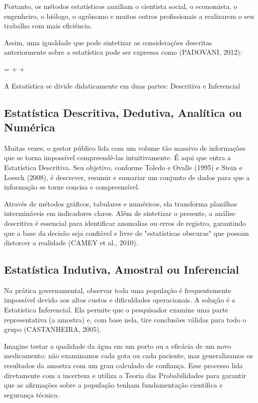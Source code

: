 Portanto, os métodos estatísticos auxiliam o cientista social, o economista, o engenheiro, o biólogo, o agrônomo e muitos outros profissionais a realizarem o seu trabalho com mais eficiência.\vskip0.3cm

Assim, uma igualdade que pode sintetizar as considerações descritas anteriormente sobre a estatística pode ser expressa como (PADOVANI, 2012):

\begin{center}
 =  +  + 
\end{center}

A Estatística se divide didaticamente em duas partes: Descritiva e Inferencial


\subsection{Estatística Descritiva, Dedutiva, Analítica ou Numérica}

Muitas vezes, o gestor público lida com um volume tão massivo de informações que se torna impossível compreendê-las intuitivamente. É aqui que entra a Estatística Descritiva. Seu objetivo, conforme Toledo e Ovalle (1995) e Stein e Loesch (2008), é descrever, resumir e sumariar um conjunto de dados para que a informação se torne concisa e compreensível. \vskip0.3cm

Através de métodos gráficos, tabulares e numéricos, ela transforma planilhas intermináveis em indicadores claros. Além de sintetizar o presente, a análise descritiva é essencial para identificar anomalias ou erros de registro, garantindo que a base da decisão seja confiável e livre de "estatísticas obscuras" que possam distorcer a realidade (CAMEY et al., 2010).

\subsection{Estatística Indutiva, Amostral ou Inferencial}

Na prática governamental, observar toda uma população é frequentemente impossível devido aos altos custos e dificuldades operacionais. A solução é a Estatística Inferencial. Ela permite que o pesquisador examine uma parte representativa (a amostra) e, com base nela, tire conclusões válidas para todo o grupo (CASTANHEIRA, 2005).  \vskip0.3cm

Imagine testar a qualidade da água em um porto ou a eficácia de um novo medicamento: não examinamos cada gota ou cada paciente, mas generalizamos os resultados da amostra com um grau calculado de confiança. Esse processo lida diretamente com a incerteza e utiliza a Teoria das Probabilidades para garantir que as afirmações sobre a população tenham fundamentação científica e segurança técnica. 


